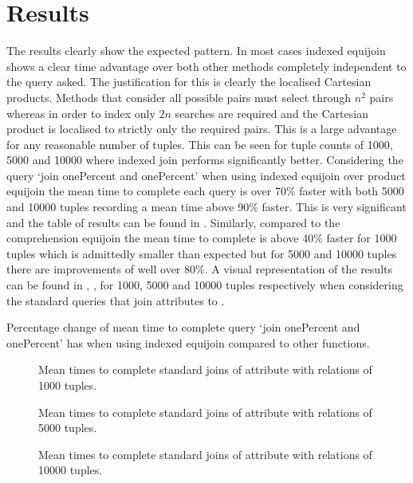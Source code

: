 \section{Results}
The results clearly show the expected pattern. In most cases indexed equijoin
shows a clear time advantage over both other methods completely independent to
the query asked. The justification for this is clearly the localised Cartesian
products. Methods that consider all possible pairs must select through $n^2$
pairs whereas in order to index only $2n$ searches are required and the
Cartesian product is localised to strictly only the required pairs. This is a
large advantage for any reasonable number of tuples. This can be seen for tuple
counts of 1000, 5000 and 10000 where indexed join performs significantly better.
Considering the query `join onePercent and onePercent' when using indexed
equijoin over product equijoin the mean time to complete each query is over 70\% faster
with both 5000 and 10000 tuples recording a mean time above 90\% faster. This
is very significant and the table of results can be found in
. Similarly, compared to the comprehension
equijoin the mean time to complete is above 40\% faster for 1000 tuples which is
admittedly smaller than expected but for 5000 and 10000 tuples there are
improvements of well over 80\%. A visual representation of the results can be
found in ,
,
 for 1000, 5000 and 10000 tuples
respectively when considering the standard queries that join attributes to
.

\begin{table}[b]
    \centering
    
    \caption{Percentage change of mean time to complete query `join onePercent
        and onePercent' has when using indexed equijoin compared to other
    functions.}
    \label{tab:percentage-change-of-means-join-onePercent-and-onePercent}
\end{table}

\begin{figure}[p]
    \centering
    
    \caption{Mean times to complete standard joins of
     attribute with relations of 1000 tuples.}
    \label{fig:benchmark:onePercent-1000}
\end{figure}

\begin{figure}[p]
    \centering
    
    \caption{Mean times to complete standard joins of
     attribute with relations of 5000 tuples.}
    \label{fig:benchmark:onePercent-5000}
\end{figure}

\begin{figure}[p]
    \centering
    
    \caption{Mean times to complete standard joins of
     attribute with relations of 10000 tuples.}
    \label{fig:benchmark:onePercent-10000}
\end{figure}

